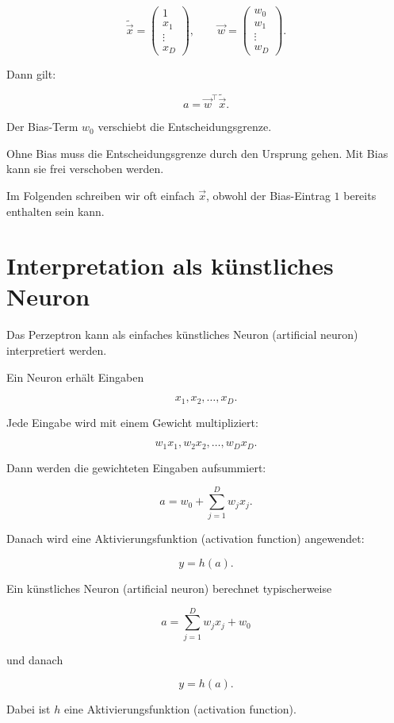 \[
    \tilde{\vec{x}}
    =
    \begin{pmatrix}
        1 \\
        x_1 \\
        \vdots \\
        x_D
    \end{pmatrix},
    \qquad
    \vec{w}
    =
    \begin{pmatrix}
        w_0 \\
        w_1 \\
        \vdots \\
        w_D
    \end{pmatrix}.
\]

Dann gilt:

\[
    a
    =
    \vec{w}^{\top}\tilde{\vec{x}}.
\]

\begin{conceptbox}
Der Bias-Term \(w_0\) verschiebt die Entscheidungsgrenze.

Ohne Bias muss die Entscheidungsgrenze durch den Ursprung gehen.
Mit Bias kann sie frei verschoben werden.
\end{conceptbox}

Im Folgenden schreiben wir oft einfach \(\vec{x}\), obwohl der Bias-Eintrag \(1\) bereits enthalten sein kann.

\section{Interpretation als künstliches Neuron}

Das Perzeptron kann als einfaches künstliches Neuron (artificial neuron) interpretiert werden.

Ein Neuron erhält Eingaben

\[
    x_1,x_2,\dots,x_D.
\]

Jede Eingabe wird mit einem Gewicht multipliziert:

\[
    w_1x_1,w_2x_2,\dots,w_Dx_D.
\]

Dann werden die gewichteten Eingaben aufsummiert:

\[
    a
    =
    w_0
    +
    \sum_{j=1}^{D}
    w_jx_j.
\]

Danach wird eine Aktivierungsfunktion (activation function) angewendet:

\[
    y
    =
    h(a).
\]

\begin{definitionbox}
Ein künstliches Neuron (artificial neuron) berechnet typischerweise

\[
    a
    =
    \sum_{j=1}^{D}
    w_jx_j
    +
    w_0
\]

und danach

\[
    y
    =
    h(a).
\]

Dabei ist \(h\) eine Aktivierungsfunktion (activation function).
\end{definitionbox}

